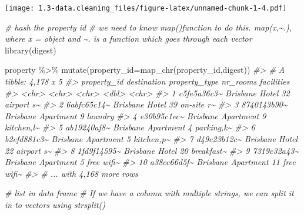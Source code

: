 \documentclass[
]{article}
\newenvironment{Shaded}{\begin{snugshade}}{\end{snugshade}}
\newcommand{\AttributeTok}[1]{\textcolor[rgb]{0.77,0.63,0.00}{#1}}
\newcommand{\CommentTok}[1]{\textcolor[rgb]{0.56,0.35,0.01}{\textit{#1}}}
\newcommand{\FunctionTok}[1]{\textcolor[rgb]{0.00,0.00,0.00}{#1}}
\newcommand{\NormalTok}[1]{#1}
\newcommand{\SpecialCharTok}[1]{\textcolor[rgb]{0.00,0.00,0.00}{#1}}
\begin{document}
\texttt{[image: 1.3-data.cleaning\_files/figure-latex/unnamed-chunk-1-4.pdf]}

\begin{Shaded}
\begin{Highlighting}[]
    
\CommentTok{\# hash the property id}
\CommentTok{\# we need to know map()function to do this. map(x,\textasciitilde{}.), where x = object and \textasciitilde{}. is a function which goes through each vector}
\FunctionTok{library}\NormalTok{(digest)}

\NormalTok{property }\SpecialCharTok{\%\textgreater{}\%} 
  \FunctionTok{mutate}\NormalTok{(}\AttributeTok{property\_id=}\FunctionTok{map\_chr}\NormalTok{(property\_id,digest))}
\CommentTok{\#\textgreater{} \# A tibble: 4,178 x 5}
\CommentTok{\#\textgreater{}    property\_id destination property\_type nr\_rooms facilities}
\CommentTok{\#\textgreater{}    \textless{}chr\textgreater{}       \textless{}chr\textgreater{}       \textless{}chr\textgreater{}            \textless{}dbl\textgreater{} \textless{}chr\textgreater{}     }
\CommentTok{\#\textgreater{}  1 c5fe5a36c3\textasciitilde{} Brisbane    Hotel               32 airport s\textasciitilde{}}
\CommentTok{\#\textgreater{}  2 6abfc65c14\textasciitilde{} Brisbane    Hotel               39 on{-}site r\textasciitilde{}}
\CommentTok{\#\textgreater{}  3 8740143b90\textasciitilde{} Brisbane    Apartment            9 laundry   }
\CommentTok{\#\textgreater{}  4 e30b95c1ec\textasciitilde{} Brisbane    Apartment            9 kitchen,l\textasciitilde{}}
\CommentTok{\#\textgreater{}  5 ab19240af8\textasciitilde{} Brisbane    Apartment            4 parking,k\textasciitilde{}}
\CommentTok{\#\textgreater{}  6 b2efd881c3\textasciitilde{} Brisbane    Apartment            5 kitchen,p\textasciitilde{}}
\CommentTok{\#\textgreater{}  7 d49c23b12c\textasciitilde{} Brisbane    Hotel               22 airport s\textasciitilde{}}
\CommentTok{\#\textgreater{}  8 1fd9f14595\textasciitilde{} Brisbane    Hotel               20 breakfast\textasciitilde{}}
\CommentTok{\#\textgreater{}  9 7319c32a43\textasciitilde{} Brisbane    Apartment            5 free wifi\textasciitilde{}}
\CommentTok{\#\textgreater{} 10 a38cc66d5f\textasciitilde{} Brisbane    Apartment           11 free wifi\textasciitilde{}}
\CommentTok{\#\textgreater{} \# ... with 4,168 more rows}

\CommentTok{\# list in data frame}
\CommentTok{\# If we have a column with multiple strings, we can split it in to vectors using strsplit()}



\end{Highlighting}
\end{Shaded}
\end{document}
